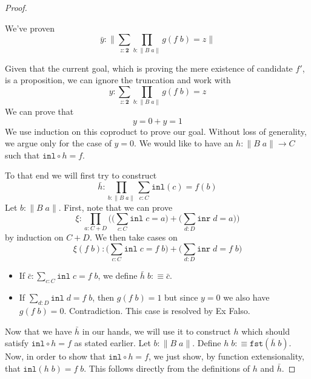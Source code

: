 \documentclass[12pt]{report}
\theoremstyle{definition}
\begin{document}
\begin{proof}
\begin{itemize}
\end{itemize}
We've proven 
$$\bar{y} : \Big\lVert \sum_{z : \mathbf{2}} \prod_{b : \lVert B\; a\rVert} g(f\; b) = z \Big\rVert$$

Given that the current goal, which is proving the mere existence of candidate $f'$, is a proposition, we can ignore the truncation and work with
$$y : \sum_{z : \mathbf{2}} \prod_{b : \lVert B\; a\rVert} g(f\; b) = z$$
We can prove that 
$$y= 0 + y = 1$$ 
We use induction on this coproduct to prove our goal. 
Without loss of generality, we argue only for the case of $y = 0$. 
We would like to have an $h : \lVert B\; a\rVert \rightarrow C$ such that $\mathtt{inl} \circ h = f$. 
\begin{center}
\end{center}
To that end we will first try to construct 
$$\bar{h} : \prod_{b : \lVert B\;a\rVert} \sum_{c:C}\mathtt{inl}(c) = f(b)$$
Let $b : \lVert B\; a\rVert$. 
First, note that we can prove 
$$\xi : \prod_{a: C+D} \Big(\big(\sum_{c : C} \mathtt{inl}\; c = a\big) + \big( \sum_{d:D} \mathtt{inr}\; d = a \big) \Big)$$
by induction on $C+D$. 
We then take cases on 
$$\xi (f\; b) : \big(\sum_{c : C} \mathtt{inl}\; c = f\; b\big) + \big( \sum_{d:D} \mathtt{inr}\; d = f\; b \big)$$
\begin{itemize}
	\item If $\bar{c} : \sum_{c : C} \mathtt{inl}\; c = f\; b$, we define $\bar{h}\; b :\equiv \bar{c}$.
	\item If $\sum_{d : D} \mathtt{inl}\; d = f\; b$, then $g(f\;b) = 1$ but since $y=0$ we also have $g(f\;b) = 0$. Contradiction. 
	This case is resolved by Ex Falso.
\end{itemize}
Now that we have $\bar{h}$ in our hands, we will use it to construct $h$ which should satisfy $\mathtt{inl} \circ h = f$ as stated earlier. 
Let $b:\lVert B\; a\rVert$. 
Define $h\;b :\equiv \mathtt{fst}(\bar{h}\; b)$. 
Now, in order to show that $\mathtt{inl} \circ h = f$, we just show, by function extensionality, that $\mathtt{inl}(h\;b )= f\;b$. 
This follows directly from the definitions of $h$ and $\bar{h}$. 


\end{proof}
\end{document}
